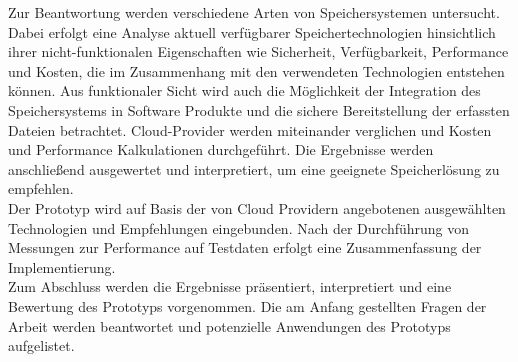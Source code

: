 Zur Beantwortung werden verschiedene Arten von Speichersystemen untersucht. Dabei erfolgt eine Analyse  aktuell verfügbarer Speichertechnologien hinsichtlich ihrer nicht-funktionalen Eigenschaften wie Sicherheit, Verfügbarkeit, Performance und Kosten, die im Zusammenhang mit den verwendeten Technologien entstehen können. Aus funktionaler Sicht wird auch die Möglichkeit der Integration des Speichersystems in Software Produkte und die sichere Bereitstellung der erfassten Dateien betrachtet. Cloud-Provider werden miteinander verglichen und Kosten und Performance Kalkulationen durchgeführt. Die Ergebnisse werden anschließend ausgewertet und interpretiert, um eine geeignete Speicherlösung zu empfehlen.\\

Der Prototyp wird auf Basis der von Cloud Providern angebotenen ausgewählten Technologien und Empfehlungen eingebunden. Nach der Durchführung von Messungen zur Performance auf Testdaten erfolgt eine Zusammenfassung der Implementierung.\\

Zum Abschluss werden die Ergebnisse präsentiert, interpretiert und eine Bewertung des Prototyps vorgenommen.  Die am Anfang gestellten Fragen der Arbeit werden beantwortet und potenzielle Anwendungen des Prototyps aufgelistet.

 